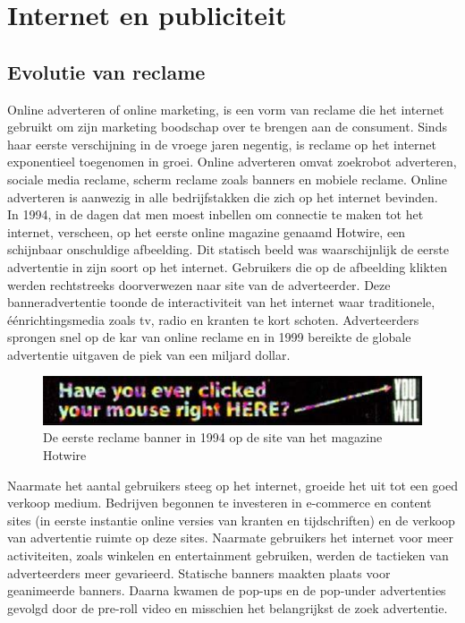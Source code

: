 \documentclass[pdftex,a4paper,12pt,twoside]{report}
\begin{document}
\chapter{Internet en publiciteit}
\label{ch:Internet en publiciteit}

\section{Evolutie van reclame}
\label{sec:Evolutie van reclame}
Online adverteren of online marketing, is een vorm van reclame die het internet gebruikt om zijn marketing boodschap over te brengen aan de consument. Sinds haar eerste verschijning in de vroege jaren negentig, is reclame op het internet exponentieel toegenomen in groei. Online adverteren omvat zoekrobot adverteren, sociale media reclame, scherm reclame zoals banners en mobiele reclame. Online adverteren is aanwezig in alle bedrijfstakken die zich op het internet bevinden.
\\
In 1994, in de dagen dat men moest inbellen om connectie te maken tot het internet, verscheen, op het eerste online magazine genaamd Hotwire, een schijnbaar onschuldige afbeelding. Dit statisch beeld was waarschijnlijk de eerste advertentie in zijn soort op het internet. Gebruikers die op de afbeelding klikten werden rechtstreeks doorverwezen naar site van de adverteerder. Deze banneradvertentie toonde de interactiviteit van het internet waar traditionele, éénrichtingsmedia zoals tv, radio en kranten te kort schoten. Adverteerders sprongen snel op de kar van online reclame en in 1999 bereikte de globale advertentie uitgaven de piek van een miljard dollar.
\begin{figure}[h!]
\centering
\includegraphics[width=12cm]{img/firstbanner}
\caption{De eerste reclame banner in 1994 op de site van het magazine Hotwire}
\label{fig: Banner-Ads}
\end{figure}
Naarmate het aantal gebruikers steeg op het internet, groeide het uit tot een goed verkoop medium. Bedrijven begonnen te investeren in e-commerce en content sites (in eerste instantie online versies van kranten en tijdschriften) en de verkoop van advertentie ruimte op deze sites. Naarmate gebruikers het internet voor meer activiteiten, zoals winkelen en entertainment gebruiken, werden de tactieken van adverteerders meer gevarieerd. Statische banners maakten plaats voor geanimeerde banners. Daarna kwamen de pop-ups en de pop-under advertenties gevolgd door de pre-roll video en misschien het belangrijkst de zoek advertentie. 
\end{document}
